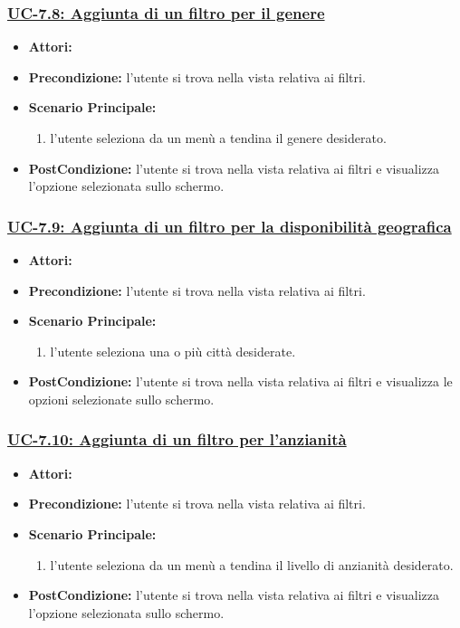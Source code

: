 \subsubsection{\underline{UC-7.8: Aggiunta di un filtro per il genere}}
\begin{itemize}
	\item \textbf{Attori:}\loggedusr
	\item \textbf{Precondizione:} l'utente si trova nella vista relativa ai filtri.
	\item \textbf{Scenario Principale:}
	\begin{enumerate}
		\item l'utente seleziona da un menù a tendina il genere desiderato.
	\end{enumerate}
	\item \textbf{PostCondizione:}  l'utente si trova nella vista relativa ai filtri e visualizza l'opzione selezionata sullo schermo.
\end{itemize}

\subsubsection{\underline{UC-7.9: Aggiunta di un filtro per la disponibilità geografica}}
\begin{itemize}
	\item \textbf{Attori:}\loggedusr
	\item \textbf{Precondizione:} l'utente si trova nella vista relativa ai filtri.
	\item \textbf{Scenario Principale:}
	\begin{enumerate}
		\item l'utente seleziona una o più città desiderate.
	\end{enumerate}
	\item \textbf{PostCondizione:}  l'utente si trova nella vista relativa ai filtri e visualizza le opzioni selezionate sullo schermo.
\end{itemize}

\subsubsection{\underline{UC-7.10: Aggiunta di un filtro per l'anzianità}}
\begin{itemize}
	\item \textbf{Attori:}\loggedusr
	\item \textbf{Precondizione:} l'utente si trova nella vista relativa ai filtri.
	\item \textbf{Scenario Principale:}
	\begin{enumerate}
		\item l'utente seleziona da un menù a tendina il livello di anzianità desiderato.
	\end{enumerate}
	\item \textbf{PostCondizione:}  l'utente si trova nella vista relativa ai filtri e visualizza l'opzione selezionata sullo schermo.
\end{itemize}

